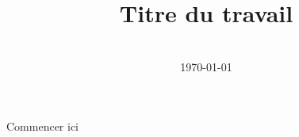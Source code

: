 \documentclass[12pt, a4paper]{article}
\title{Titre du travail}
\author{\JL} %
\date{\US \\ \today} %
\begin{document}
\maketitlepage

Commencer ici

\blankpage

\end{document}
